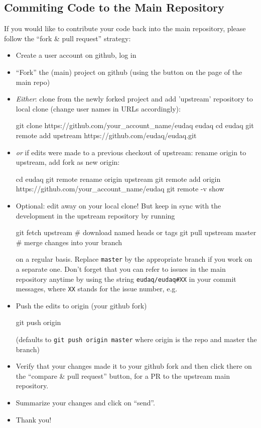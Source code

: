\subsection{Commiting Code to the Main Repository}
\label{sec:commiting}



If you would like to contribute your code back into the main repository, please follow the ``fork \& pull request'' strategy:

\begin{itemize}
\item Create a user account on github, log in
\item ``Fork'' the (main) project on github (using the button on the page of the main repo)
\item \emph{Either}: clone from the newly forked project and add
  'upstream' repository to local clone (change user names in URLs
  accordingly):
  \begin{listing}[mybash]
git clone https://github.com/your_account_name/eudaq eudaq
cd eudaq
git remote add upstream https://github.com/eudaq/eudaq.git
\end{listing}
\item \emph{or} if edits were made to a previous checkout of upstream: rename origin to upstream, add fork as new origin:

  \begin{listing}[mybash]
cd eudaq
git remote rename origin upstream
git remote add origin https://github.com/your_account_name/eudaq
git remote -v show
\end{listing}
\item Optional: edit away on your local clone! But keep in sync with
  the development in the upstream repository by running
  \begin{listing}
git fetch upstream        # download named heads or tags
git pull upstream master  # merge changes into your branch
\end{listing}
on a regular basis. Replace \texttt{master} by the appropriate branch if you work on a separate one.
Don't forget that you can refer to issues in the main repository anytime by using the string \texttt{eudaq/eudaq\#XX} in your commit messages, where \texttt{XX} stands for the issue number, e.g.
\item Push the edits to origin (your github fork)
  \begin{listing}[mybash]
git push origin
\end{listing}
(defaults to \texttt{git push origin master} where origin is the repo and master the branch)
\item Verify that your changes made it to your github fork and then click there on the ``compare \& pull request'' button, for a PR to the upstream main repository.
\item Summarize your changes and click on ``send''.
\item Thank you!
\end{itemize}


